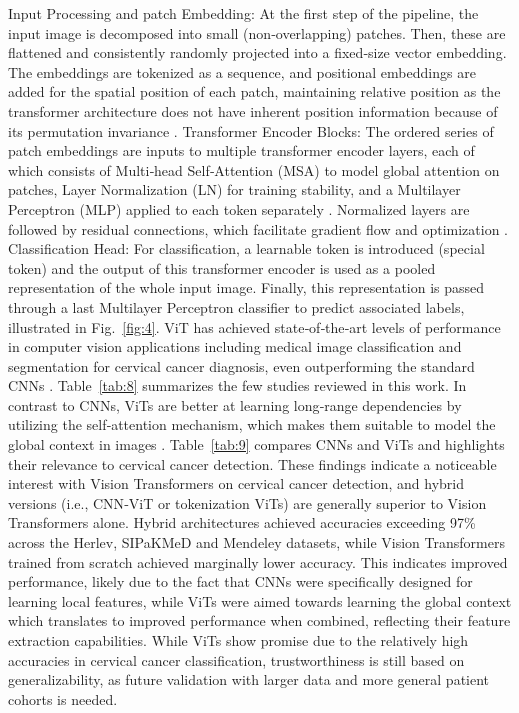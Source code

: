 \documentclass[final,5p,times,twocolumn,authoryear]{elsarticle}
\begin{document}
Input Processing and patch Embedding: At the first step of the pipeline, the input image is decomposed into small (non‑overlapping) patches. Then, these are flattened and consistently randomly projected into a fixed‑size vector embedding. The embeddings are tokenized as a sequence, and positional embeddings are added for the spatial position of each patch, maintaining relative position as the transformer architecture does not have inherent position information because of its permutation invariance \cite{ref94}.
Transformer Encoder Blocks: The ordered series of patch embeddings are inputs to multiple transformer encoder layers, each of which consists of Multi‑head Self‑Attention (MSA) to model global attention on patches, Layer Normalization (LN) for training stability, and a Multilayer Perceptron (MLP) applied to each token separately \cite{ref17}. Normalized layers are followed by residual connections, which facilitate gradient flow and optimization \cite{ref95}.
Classification Head: For classification, a learnable token is introduced (special token) and the output of this transformer encoder is used as a pooled representation of the whole input image. Finally, this representation is passed through a last Multilayer Perceptron classifier to predict associated labels, illustrated in Fig.~\ref{fig:4}.
ViT has achieved state‑of‑the‑art levels of performance in computer vision applications including medical image classification and segmentation for cervical cancer diagnosis, even outperforming the standard CNNs \cite{ref96}. Table~\ref{tab:8} summarizes the few studies reviewed in this work. In contrast to CNNs, ViTs are better at learning long‑range dependencies by utilizing the self‑attention mechanism, which makes them suitable to model the global context in images \cite{ref97}. Table~\ref{tab:9} compares CNNs and ViTs and highlights their relevance to cervical cancer detection.
These findings indicate a noticeable interest with Vision Transformers on cervical cancer detection, and hybrid versions (i.e., CNN‑ViT or tokenization ViTs) are generally superior to Vision Transformers alone. Hybrid architectures achieved accuracies exceeding 97\% across the Herlev, SIPaKMeD and Mendeley datasets, while Vision Transformers trained from scratch achieved marginally lower accuracy. This indicates improved performance, likely due to the fact that CNNs were specifically designed for learning local features, while ViTs were aimed towards learning the global context which translates to improved performance when combined, reflecting their feature extraction capabilities. While ViTs show promise due to the relatively high accuracies in cervical cancer classification, trustworthiness is still based on generalizability, as future validation with larger data and more general patient cohorts is needed.
\end{document}
